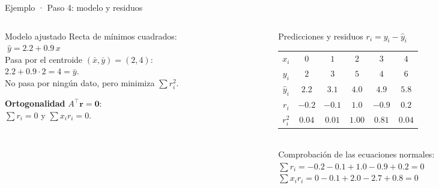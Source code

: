 \documentclass[aspectratio=169,10pt]{beamer}
\begin{document}
\begin{frame}{Ejemplo · Paso 4: modelo y residuos}
\begin{columns}[T]
\begin{column}{0.40\textwidth}
\begin{cardidea}{Modelo ajustado}{\faSuperscript}
{\footnotesize Recta de mínimos cuadrados:\\[0.4mm]
$\boxed{\;\hat y=2.2+0.9\,x\;}$\\[1.2mm]
Pasa por el centroide $(\bar x,\bar y)=(2,4)$:\\[0.3mm]
$2.2+0.9\cdot2=4=\bar y$. \checkmark\\[1.0mm]
No pasa por ningún dato, pero minimiza $\sum r_i^2$.}
\end{cardidea}
\vspace{1mm}
\begin{cardnota}[\faCheckCircle]
{\footnotesize \textbf{Ortogonalidad} $A^{\!\top}\mathbf r=\mathbf 0$:\\[0.3mm]
$\sum r_i=0$ y $\sum x_ir_i=0$.}
\end{cardnota}
\end{column}
\begin{column}{0.58\textwidth}
\begin{cardgear}{Predicciones y residuos $r_i=y_i-\hat y_i$}{\faTable}
\centering
{\footnotesize\renewcommand{\arraystretch}{1.15}\setlength{\tabcolsep}{6pt}
\begin{tabular}{c|ccccc}
$x_i$ & $0$ & $1$ & $2$ & $3$ & $4$\\
$y_i$ & $2$ & $3$ & $5$ & $4$ & $6$\\
$\hat y_i$ & $2.2$ & $3.1$ & $4.0$ & $4.9$ & $5.8$\\\hline
$r_i$ & $-0.2$ & $-0.1$ & $1.0$ & $-0.9$ & $0.2$\\
$r_i^2$ & $0.04$ & $0.01$ & $1.00$ & $0.81$ & $0.04$\\
\end{tabular}}\\[1.6mm]
{\footnotesize Comprobación de las ecuaciones normales:\\[0.3mm]
$\sum r_i=-0.2-0.1+1.0-0.9+0.2=0$\\[0.2mm]
$\sum x_ir_i=0-0.1+2.0-2.7+0.8=0$}
\end{cardgear}
\end{column}
\end{columns}
\end{frame}
\end{document}
